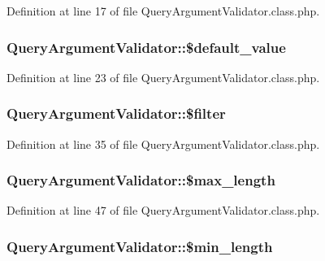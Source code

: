 Definition at line 17 of file Query\-Argument\-Validator.\-class.\-php.

\hypertarget{classQueryArgumentValidator_ae61c68b0a9cd40caa31c464ffddf4ffa}{
\subsubsection[{\$default\-\_\-value}]{\setlength{\rightskip}{0pt plus 5cm}Query\-Argument\-Validator\-::\$default\-\_\-value}}\label{classQueryArgumentValidator_ae61c68b0a9cd40caa31c464ffddf4ffa}


Definition at line 23 of file Query\-Argument\-Validator.\-class.\-php.

\hypertarget{classQueryArgumentValidator_a43b0653e37185f392daf500c50484186}{
\subsubsection[{\$filter}]{\setlength{\rightskip}{0pt plus 5cm}Query\-Argument\-Validator\-::\$filter}}\label{classQueryArgumentValidator_a43b0653e37185f392daf500c50484186}


Definition at line 35 of file Query\-Argument\-Validator.\-class.\-php.

\hypertarget{classQueryArgumentValidator_a6c99b1e774c49ebe4cbb5f8671156654}{
\subsubsection[{\$max\-\_\-length}]{\setlength{\rightskip}{0pt plus 5cm}Query\-Argument\-Validator\-::\$max\-\_\-length}}\label{classQueryArgumentValidator_a6c99b1e774c49ebe4cbb5f8671156654}


Definition at line 47 of file Query\-Argument\-Validator.\-class.\-php.

\hypertarget{classQueryArgumentValidator_a5553903c3bdf620408196db924a918c0}{
\subsubsection[{\$min\-\_\-length}]{\setlength{\rightskip}{0pt plus 5cm}Query\-Argument\-Validator\-::\$min\-\_\-length}}\label{classQueryArgumentValidator_a5553903c3bdf620408196db924a918c0}


